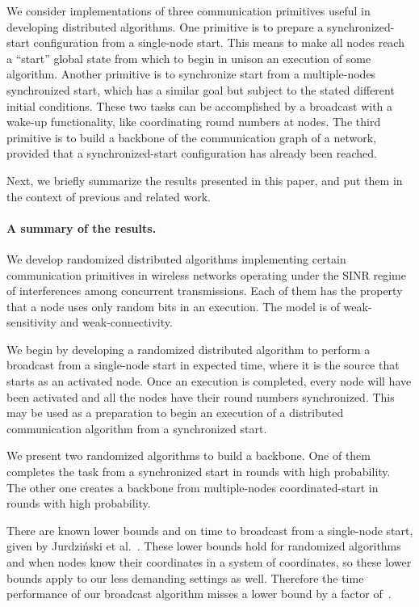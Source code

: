 \documentclass[11pt]{article}
\newcommand{\BBB}{\vspace*{-\bigskipamount}}
\newcommand{\Paragraph}[1]{\BBB\paragraph{#1}}
\begin{document}
We consider implementations of three communication primitives useful in developing  distributed algorithms.
One primitive is to prepare a synchronized-start configuration from a single-node start.
This means to make all nodes reach a ``start'' global state from which to begin  in unison an execution of some algorithm.
Another primitive is to synchronize start from a multiple-nodes synchronized start, which has a similar goal but  subject to the stated different initial conditions.
These two tasks can be accomplished by a broadcast with a wake-up functionality, like coordinating round numbers at nodes.
The third primitive is to build a backbone of the communication graph of a network, provided that a synchronized-start configuration has already been reached.

Next, we briefly summarize the results presented in this paper, and put them in the context of previous and related work.


\Paragraph{A summary of the results.}


We develop randomized distributed algorithms implementing certain communication primitives in wireless networks operating under the SINR regime of interferences among concurrent transmissions.
Each of them has the property that  a node uses only  random bits in an execution.
The model is of weak-sensitivity and weak-connectivity. 


We begin by developing a randomized distributed algorithm to perform a broadcast from a single-node start in  expected time, where it is the source that starts as an activated node. 
Once an execution is completed, every node will have been activated and all the nodes have  their round numbers synchronized.
This may be used as a preparation to begin an execution of a distributed communication algorithm from a synchronized start.

We present two randomized algorithms to build a backbone.
One of them completes the task from a synchronized start in   rounds with high probability.
The other one creates a backbone from multiple-nodes coordinated-start in  rounds with high probability.


There are known lower bounds  and  on time to broadcast from a single-node start, given by Jurdzi\'nski et al.~\cite{JKS-ICALP-13}.
These lower bounds hold for randomized algorithms and when nodes know their coordinates in a system of coordinates, so these lower bounds apply to our less demanding settings as well.
Therefore the time performance of our broadcast  algorithm misses a lower bound  by a factor of~.
\end{document}
